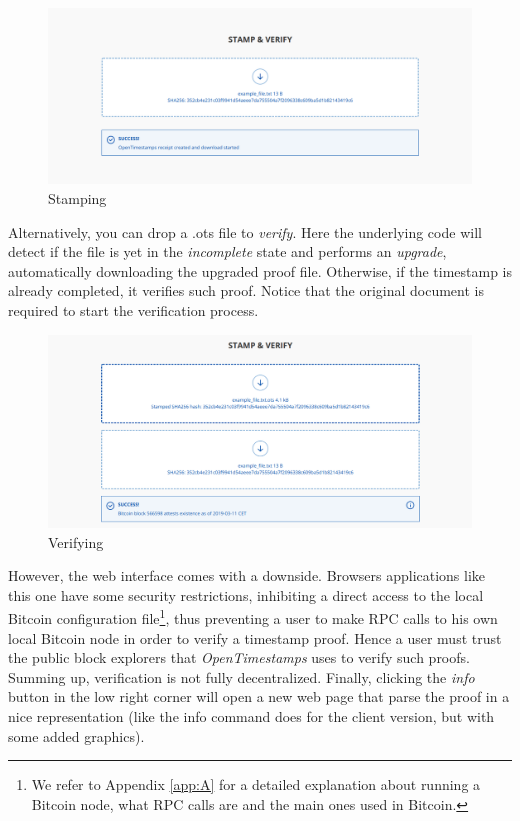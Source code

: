 \bigskip
\begin{figure}[htbp]
    \centering
	\includegraphics[width=1\linewidth]{Images/stamping.png}
	\caption{Stamping}
	\label{fig:ots-stamping}
\end{figure}

\newpage
\noindent
Alternatively, you can drop a \colorbox{light-gray}{.ots} file to \textit{verify}. Here the underlying code will detect if the file is yet in the \textit{incomplete} state and performs an \textit{upgrade}, automatically downloading the upgraded proof file. Otherwise, if the timestamp is already completed, it verifies such proof. Notice that the original document is required to start the verification process.

\bigskip
\begin{figure}[htbp]
    \centering
	\includegraphics[width=1\linewidth]{Images/verify.png}
	\caption{Verifying}
	\label{fig:ots-verifying}
\end{figure}

\bigskip
\noindent
However, the web interface comes with a downside. Browsers applications like this one have some security restrictions, inhibiting a direct access to the local Bitcoin configuration file\footnote{We refer to Appendix \ref{app:A} for a detailed explanation about running a Bitcoin node, what RPC calls are and the main ones used in Bitcoin.}, thus preventing a user to make RPC calls to his own local Bitcoin node in order to verify a timestamp proof. Hence a user must trust the public block explorers that \textit{OpenTimestamps} uses to verify such proofs. Summing up, verification is not fully decentralized. Finally, clicking the \textit{info} button in the low right corner will open a new web page that parse the proof in a nice representation (like the \colorbox{light-gray}{info} command does for the client version, but with some added graphics).





